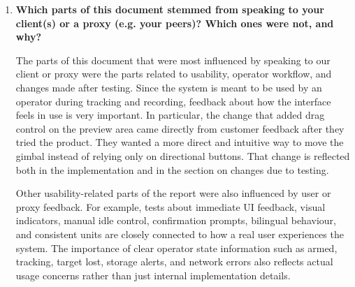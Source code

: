 \documentclass[12pt, titlepage]{article}
\begin{document}
\begin{enumerate}
        Another smaller pain point was avoiding repetition. Many tests supported more
        than one purpose at the same time. A single test could support module-level
        verification, nonfunctional discussion, and traceability to requirements all at
        once. For example, a test like API error handling can support both robustness
        discussion and backend module traceability, while a test like control-page drag
        can support both usability and frontend module verification. We resolved this
        by using traceability tables and references between sections so the same
        evidence could be reused without rewriting the same explanation too many times.

  \item \textbf{Which parts of this document stemmed from speaking to your client(s) or a proxy
          (e.g. your peers)? Which ones were not, and why?}

        The parts of this document that were most influenced by speaking to our client
        or proxy were the parts related to usability, operator workflow, and changes
        made after testing. Since the system is meant to be used by an operator during
        tracking and recording, feedback about how the interface feels in use is very
        important. In particular, the change that added drag control on the preview
        area came directly from customer feedback after they tried the product. They
        wanted a more direct and intuitive way to move the gimbal instead of relying
        only on directional buttons. That change is reflected both in the
        implementation and in the section on changes due to testing.

        Other usability-related parts of the report were also influenced by user or
        proxy feedback. For example, tests about immediate UI feedback, visual
        indicators, manual idle control, confirmation prompts, bilingual behaviour, and
        consistent units are closely connected to how a real user experiences the
        system. The importance of clear operator state information such as armed,
        tracking, target lost, storage alerts, and network errors also reflects actual
        usage concerns rather than just internal implementation details.


\end{enumerate}
\end{document}
